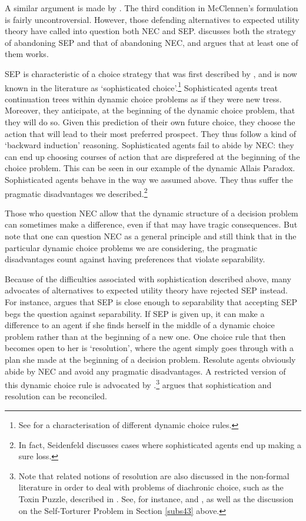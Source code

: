 A similar argument is made by \citet{Seidenfeld1988}. The third condition in McClennen's formulation is fairly uncontroversial. However, those defending alternatives to expected utility theory have called into question both NEC and SEP. \citet{Buchak2013} discusses both the strategy of abandoning SEP and that of abandoning NEC, and argues that at least one of them works.

SEP is characteristic of a choice strategy that was first described by \citet{Strotz1956}, and is now known in the literature as `sophisticated choice'.\footnote{See \citet{McClennen1990} for a characterisation of different dynamic choice rules.} Sophisticated agents treat continuation trees within dynamic choice problems as if they were new tress. Moreover, they anticipate, at the beginning of the dynamic choice problem, that they will do so. Given this prediction of their own future choice, they choose the action that will lead to their most preferred prospect. They thus follow a kind of `backward induction' reasoning. Sophisticated agents fail to abide by NEC: they can end up choosing courses of action that are disprefered at the beginning of the choice problem. This can be seen in our example of the dynamic Allais Paradox. Sophisticated agents behave in the way we assumed above. They thus suffer the pragmatic disadvantages we described.\footnote{In fact, Seidenfeld discusses cases where sophisticated agents end up making a sure loss.}

Those who question NEC allow that the dynamic structure of a decision problem can sometimes make a difference, even if that may have tragic consequences. But note that one can question NEC as a general principle and still think that in the particular dynamic choice problems we are considering, the pragmatic disadvantages count against having preferences that violate separability.

Because of the difficulties associated with sophistication described above, many advocates of alternatives to expected utility theory have rejected SEP instead. For instance, \citet{Machina1989} argues that SEP is close enough to separability that accepting SEP begs the question against separability. If SEP is given up, it can make a difference to an agent if she finds herself in the middle of a dynamic choice problem rather than at the beginning of a new one. One choice rule that then becomes open to her is `resolution', where the agent simply goes through with a plan she made at the beginning of a decision problem. Resolute agents obviously abide by NEC and avoid any pragmatic disadvantages. A restricted version of this dynamic choice rule is advocated by \citet{McClennen1990}.\footnote{Note that related notions of resolution are also discussed in the non-formal literature in order to deal with problems of diachronic choice, such as the Toxin Puzzle, described in \citet{Kavka1983}. See, for instance, \citet{Holton2009} and \citet{Bratman1998}, as well as the discussion on the Self-Torturer Problem in Section \ref{subs43} above.} \citet{Rabinowicz1995} argues that sophistication and resolution can be reconciled.

